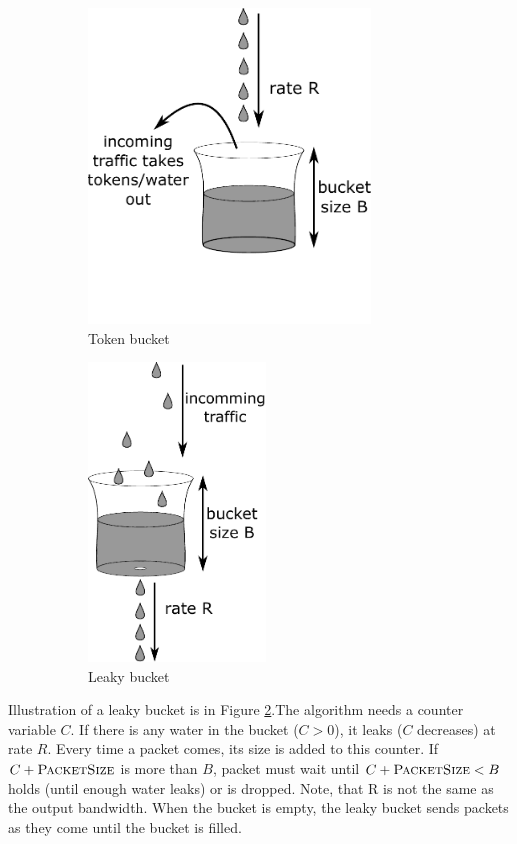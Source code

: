 \begin{figure}
	\centering
	\begin{subfigure}{.6\linewidth}
		\centering
		\includegraphics[width=75mm]{drawings/token_bucket}
		\caption{Token bucket}
		\label{fig08:token}
	\end{subfigure}%
	\begin{subfigure}{.4\linewidth}
		\centering
		\includegraphics[width=47mm]{drawings/leaky_bucket}
		\caption{Leaky bucket}
		\label{fig08:leaky}
	\end{subfigure}
	\caption{}
	\label{fig08:token_leaky}
\end{figure}

Illustration of a leaky bucket is in Figure \ref{fig08:leaky}.The algorithm needs a counter variable $C$. If there is any water in the bucket ($C > 0$), it leaks ($C$ decreases) at rate $R$. Every time a packet comes, its size is added to this counter. If $C + \textsc{PacketSize}$ is more than $B$, packet must wait until $C + \textsc{PacketSize} < B$ holds (until enough water leaks) or is dropped. Note, that R is not the same as the output bandwidth. When the bucket is empty, the leaky bucket sends packets as they come until the bucket is filled. 

